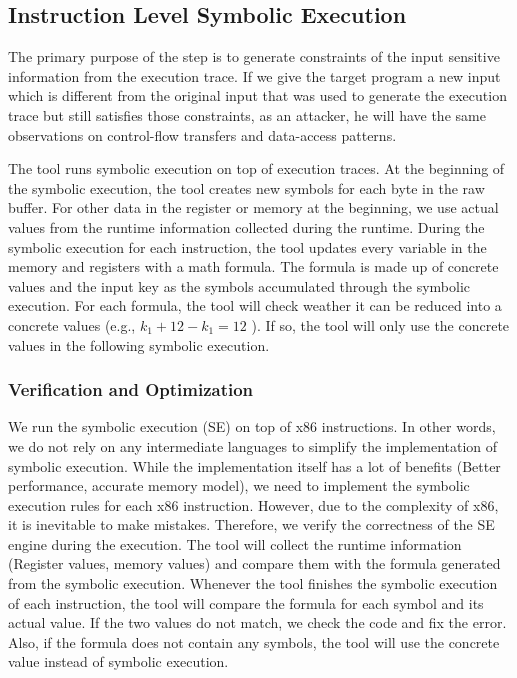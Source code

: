 \subsection{Instruction Level Symbolic Execution}
\label{InstructionSE}
The primary purpose of the step is to generate constraints of the input sensitive information from the execution trace. If we give the target program a new input which is different from the original input that was used to generate the execution trace but still satisfies those constraints, as an attacker, he will have the same observations on control-flow transfers and data-access patterns.

The tool runs symbolic execution on top of execution traces. At the beginning of the symbolic execution, the tool creates new symbols for each byte in the raw buffer. For other data in the register or memory at the beginning, we use actual values from the runtime information collected during the runtime. During the symbolic execution for each instruction, the tool updates every variable in the memory and registers with a math formula. The formula is made up of concrete values and the input key as the symbols accumulated through the symbolic execution.
For each formula, the tool will check weather it can be reduced into a concrete values (e.g., $k_1+12-k_1 = 12$ ). If so, the tool will only use the concrete values in the following symbolic execution.

\subsubsection{Verification and Optimization}
We run the symbolic execution (SE) on top of x86 instructions. In other words, we do not rely on any intermediate languages to simplify the implementation of symbolic execution. While the implementation itself has a lot of benefits (Better performance, accurate memory model), we need to implement the symbolic execution rules for each x86 instruction. 
However, due to the complexity of x86, it is inevitable to make mistakes. Therefore, we verify the correctness of the SE engine during the execution. 
The tool will collect the runtime information (Register values, memory values) and compare them with the formula generated from the symbolic execution. Whenever the tool finishes the symbolic execution of each instruction, the tool will compare the formula for each symbol and its actual value. If the two values do not match, we check the code and fix the error. Also, if the formula does not contain any symbols, the tool will use the concrete value instead of symbolic execution.

